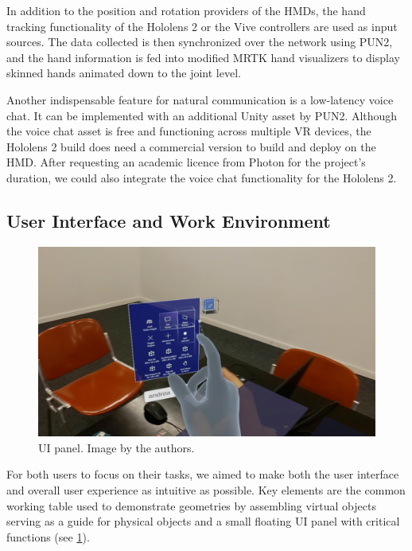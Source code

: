 \documentclass[10pt,twocolumn,letterpaper,english]{article}
\begin{document}
In addition to the position and rotation providers of the HMDs, the hand tracking functionality of the Hololens 2 or the Vive controllers are used as input sources. The data collected is then synchronized over the network using PUN2, and the hand information is fed into modified MRTK hand visualizers to display skinned hands animated down to the joint level.

Another indispensable feature for natural communication is a low-latency voice chat. It can be implemented with an additional Unity asset by PUN2. Although the voice chat asset is free and functioning across multiple VR devices, the Hololens 2 build does need a commercial version to build and deploy on the HMD. After requesting an academic licence from Photon for the project's duration, we could also integrate the voice chat functionality for the Hololens 2.

\subsection{User Interface and Work Environment}

\begin{figure}[!htp]
    \centering
    \includegraphics[width=1\linewidth]{UI2.jpg}
    \caption{UI panel. Image by the authors.}
    \label{fig:UI}
\end{figure}

For both users to focus on their tasks, we aimed to make both the user interface and overall user experience as intuitive as possible. Key elements are the common working table used to demonstrate geometries by assembling virtual objects serving as a guide for physical objects and a small floating UI panel with critical functions (see \cref{fig:UI}).
\end{document}
